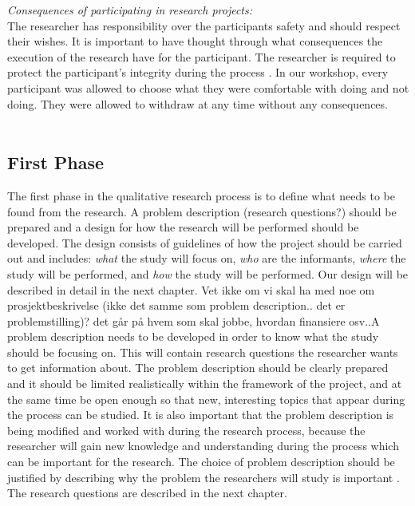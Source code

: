 \emph{Consequences of participating in research projects:}\\
The researcher has responsibility over the participants safety and should respect their wishes. It is important to have thought through what consequences the execution of the research have for the participant. The researcher is required to protect the participant's integrity during the process \cite{qualitative}. In our workshop, every participant was allowed to choose what they were comfortable with doing and not doing. They were allowed to withdraw at any time without any consequences.  \\ \\

\subsection{First Phase} 
The first phase in the qualitative research process is to define what needs to be found from the research. A problem description (research questions?) should be prepared and a design for how the research will be performed should be developed. The design consists of guidelines of how the project should be carried out and includes: \emph{what} the study will focus on, \emph{who} are the informants, \emph{where} the study will be performed, and \emph{how} the study will be performed. Our design will be described in detail in the next chapter. Vet ikke om vi skal ha med noe om prosjektbeskrivelse (ikke det samme som problem description.. det er problemstilling)? det går på hvem som skal jobbe, hvordan finansiere osv..A problem description needs to be developed in order to know what the study should be focusing on. This will contain research questions the researcher wants to get information about. The problem description should be clearly prepared and it should be limited realistically within the framework of the project, and at the same time be open enough so that new, interesting topics that appear during the process can be studied. It is also important that the problem description is being modified and worked with during the research process, because the researcher will gain new knowledge and understanding during the process which can be important for the research. The choice of problem description should be justified by describing why the problem the researchers will study is important \cite{qualitative}. The research questions are described in the next chapter. 

